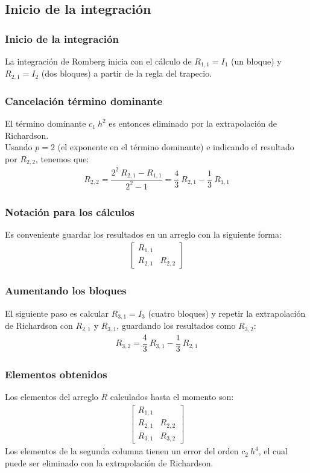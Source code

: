 \subsection*{Inicio de la integración}
\begin{frame}
\frametitle{Inicio de la integración}
La integración de Romberg inicia con el cálculo de $R_{1, 1} = I_{1}$ (un bloque) y $R_{2, 1} = I_{2}$ (dos bloques) a partir de la regla del trapecio.
\end{frame}
\begin{frame}
\frametitle{Cancelación término dominante}
El término dominante $c_{1} \: h^{2}$ es entonces eliminado por la extrapolación de Richardson.
\\
\bigskip
Usando $p = 2$ (el exponente en el término dominante) e indicando el resultado por $R_{2, 2}$, tenemos que:
\begin{align*}
R_{2, 2} = \dfrac{2^{2} \: R_{2, 1} - R_{1, 1}}{2^{2} - 1} = \dfrac{4}{3} \: R_{2, 1} - \dfrac{1}{3} \: R_{1, 1}
\end{align*}
\end{frame}
\begin{frame}
\frametitle{Notación para los cálculos}
Es conveniente guardar los resultados en un arreglo con la siguiente forma:
\begin{align*}
\begin{bmatrix}
R_{1, 1} & \\
R_{2, 1} & R_{2, 2}
\end{bmatrix}
\end{align*}
\end{frame}
\begin{frame}
\frametitle{Aumentando los bloques}
El siguiente paso es calcular $R_{3, 1} = I_{3}$ (cuatro bloques) y repetir la extrapolación de Richardson con $R_{2, 1}$ y $R_{3, 1}$, guardando los resultados como $R_{3, 2}$:
\begin{align*}
R_{3, 2} = \dfrac{4}{3} \: R_{3,1} - \dfrac{1}{3} \: R_{2,1}
\end{align*}
\end{frame}
\begin{frame}
\frametitle{Elementos obtenidos}
Los elementos del arreglo $R$ calculados hasta el momento son:
\begin{align*}
\begin{bmatrix}
R_{1, 1} & \\
R_{2, 1} & R_{2, 2} \\
R_{3, 1} & R_{3, 2}
\end{bmatrix}
\end{align*}
Los elementos de la segunda columna tienen un error del orden $c_{2} \: h^{4}$, el cual puede ser eliminado con la extrapolación de Richardson.
\end{frame}
